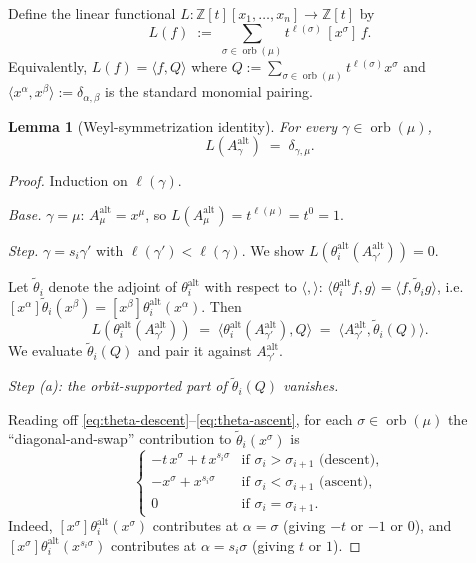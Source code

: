 \documentclass[11pt]{article}
\newtheorem{lemma}[theorem]{Lemma}
\theoremstyle{definition}
\theoremstyle{remark}
\newcommand{\orb}{\operatorname{orb}}
\newcommand{\Aalt}{A^{\mathrm{alt}}}
\newcommand{\thetaalt}{\theta^{\mathrm{alt}}}
\begin{document}
Define the linear functional $L: \mathbb Z[t][x_1,\ldots,x_n] \to \mathbb Z[t]$ by
\[
  L(f) \;:=\; \sum_{\sigma \in \orb(\mu)} t^{\ell(\sigma)}\, [x^\sigma]\, f.
\]
Equivalently, $L(f) = \langle f, Q\rangle$ where $Q := \sum_{\sigma \in \orb(\mu)} t^{\ell(\sigma)} x^\sigma$
and $\langle x^\alpha, x^\beta\rangle := \delta_{\alpha,\beta}$ is the standard
monomial pairing.

\begin{lemma}[Weyl-symmetrization identity]\label{lem:weyl}
For every $\gamma \in \orb(\mu)$,
\[
  L(\Aalt_\gamma) \;=\; \delta_{\gamma,\mu}.
\]
\end{lemma}

\begin{proof}
Induction on $\ell(\gamma)$.

\emph{Base.} $\gamma = \mu$: $\Aalt_\mu = x^\mu$, so
$L(\Aalt_\mu) = t^{\ell(\mu)} = t^0 = 1$. \checkmark

\emph{Step.} $\gamma = s_i \gamma'$ with $\ell(\gamma') < \ell(\gamma)$. We show
$L(\thetaalt_i(\Aalt_{\gamma'})) = 0$.

Let $\widetilde\theta_i$ denote the adjoint of $\thetaalt_i$ with respect to $\langle,\rangle$:
$\langle \thetaalt_i f, g\rangle = \langle f, \widetilde\theta_i g\rangle$, i.e.
$[x^\alpha]\widetilde\theta_i(x^\beta) = [x^\beta]\thetaalt_i(x^\alpha)$. Then
\[
  L(\thetaalt_i(\Aalt_{\gamma'})) \;=\; \langle \thetaalt_i(\Aalt_{\gamma'}), Q\rangle
                                 \;=\; \langle \Aalt_{\gamma'}, \widetilde\theta_i(Q)\rangle.
\]
We evaluate $\widetilde\theta_i(Q)$ and pair it against $\Aalt_{\gamma'}$.

\medskip\noindent\emph{Step (a): the orbit-supported part of $\widetilde\theta_i(Q)$ vanishes.}

Reading off \eqref{eq:theta-descent}--\eqref{eq:theta-ascent}, for each
$\sigma \in \orb(\mu)$ the ``diagonal-and-swap'' contribution to $\widetilde\theta_i(x^\sigma)$ is
\[
  \begin{cases}
    -t\,x^\sigma + t\,x^{s_i\sigma} & \text{if $\sigma_i > \sigma_{i+1}$ (descent)},\\
    -x^\sigma + x^{s_i\sigma} & \text{if $\sigma_i < \sigma_{i+1}$ (ascent)},\\
    0 & \text{if $\sigma_i = \sigma_{i+1}$}.
  \end{cases}
\]
Indeed, $[x^\sigma]\thetaalt_i(x^\sigma)$ contributes at $\alpha = \sigma$
(giving $-t$ or $-1$ or $0$), and $[x^\sigma]\thetaalt_i(x^{s_i\sigma})$ contributes
at $\alpha = s_i\sigma$ (giving $t$ or $1$).


\end{proof}
\end{document}
